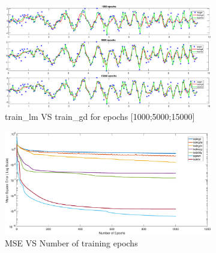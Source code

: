 \begin{figure}[!htpb]
	\begin{subfigure}[b]{0.33\textwidth}
		\centering
		\captionsetup{width=1\linewidth, format = hang}
		\includegraphics[height = 0.7\textwidth,width = 1\textwidth]{Exercise1/Report/train_lm_gd_noise_2}
		\caption{train\_lm VS  train\_gd for epochs [1000;5000;15000]}\label{fig:train_lm_gd_noise_2}
	\end{subfigure}%
	\begin{subfigure}[b]{0.33\textwidth}
		\centering
		\captionsetup{width=0.8\linewidth, format = hang}
		\includegraphics[height = 0.7\textwidth,width = 1\textwidth]{Exercise1/Report/mse_1_noise}
		\caption{MSE VS Number of training epochs}\label{fig:mse_1_noise}
	\end{subfigure}%
	\begin{subfigure}[b]{0.33\textwidth}

\end{subfigure}
\end{figure}
